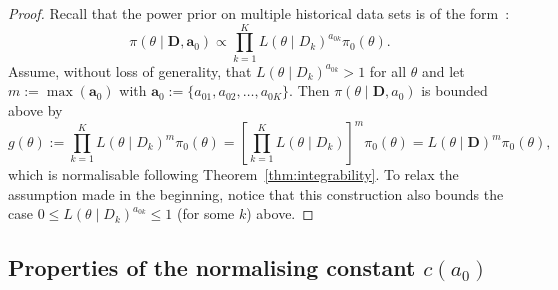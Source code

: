 \documentclass[a4paper, notitlepage, 11pt]{article}
\begin{document}
\begin{proof}
 Recall that the power prior on multiple historical data sets is of the form~\citep[Eq. 2.9]{Ibrahim2015}:
 \[ \pi(\theta \mid \boldsymbol D, \boldsymbol a_0) \propto \prod_{k=1}^K L(\theta \mid D_k)^{a_{0k}} \pi_0(\theta). \]
Assume, without loss of generality, that $L(\theta \mid  D_k)^{a_{0k}} > 1$ for all $\theta$ and let $m := \max(\boldsymbol a_0)$ with $\boldsymbol a_0 := \{ a_{01}, a_{02}, \ldots, a_{0K}\}$.
Then $\pi(\theta \mid \boldsymbol D, a_0)$ is bounded above by 
\[  g(\theta) :=  \prod_{k=1}^K L(\theta \mid D_k)^{m} \pi_0(\theta) =  \left[ \prod_{k=1}^K L(\theta \mid D_k) \right]^m  \pi_0(\theta) = L(\theta \mid \boldsymbol D)^m \pi_0(\theta), \]
which is normalisable following Theorem~\ref{thm:integrability}.
To relax the assumption made in the beginning, notice that this construction also bounds the case $ 0 \leq  L(\theta \mid  D_k)^{a_{0k}} \leq 1$ (for some $k$) above.
\end{proof}

\subsection{Properties of the normalising constant $c(a_0)$}
\label{sec:properties}
\end{document}
